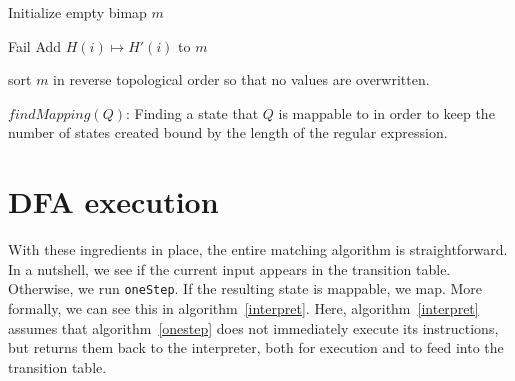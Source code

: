 \documentclass[11pt]{Thesis}
\theoremstyle{definition}
\begin{document}
\begin{algorithm*}[htpb]
\begin{algorithmic}[1]
    

	\State Initialize empty bimap $m$ 
	
    
			
				\State Fail
			\Else
				\State Add $H(i) \mapsto H'(i)$ to $m$
			\EndIf
		\EndFor
    \EndFor
\EndFor
{}
  
	\State sort $m$ in reverse topological order so that no values are overwritten.
  
  \caption[$findMapping(Q)$]{\label{findmapping}$findMapping(Q)$: Finding a state that $Q$ is
mappable to in order to keep the number of states created bound by the length
of the regular expression.}
\end{algorithmic}
\end{algorithm*}

\section{DFA execution}
With these ingredients in place, the entire matching algorithm is
straightforward.  In a nutshell, we see if the current input appears
in the transition table. Otherwise, we run \texttt{oneStep}. If the
resulting state is mappable, we map.  More formally, we can see
this in algorithm~\ref{interpret}. Here, algorithm~\ref{interpret} 
assumes that algorithm~\ref{onestep} does not immediately execute 
its instructions, but returns them back to the interpreter, both for 
execution and to feed into the transition table.
\end{document}
